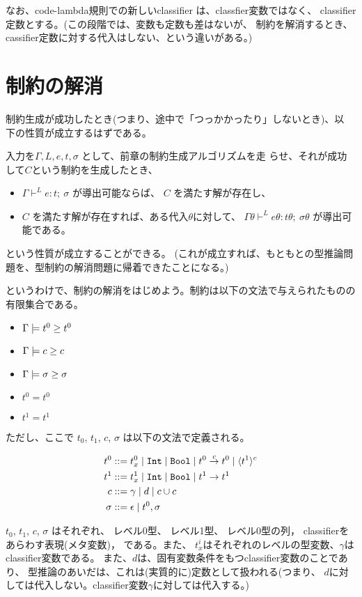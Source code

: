 なお、code-lambda規則での新しいclassifier は、classfier変数ではなく、
classifier定数とする。(この段階では、変数も定数も差はないが、
制約を解消するとき、cassifier定数に対する代入はしない、という違いがある。)

\section{制約の解消}

制約生成が成功したとき(つまり、途中で「つっかかったり」しないとき)、以
下の性質が成立するはずである。

入力を$\Gamma, L, e, t,\sigma$ として、前章の制約生成アルゴリズムを走
らせ、それが成功して$C$という制約を生成したとき、
\begin{itemize}
\item
  $\Gamma \vdash^L e: t; ~ \sigma$ が導出可能ならば、
  $C$ を満たす解が存在し、
\item
  $C$ を満たす解が存在すれば、ある代入$\theta$に対して、
  $\Gamma\theta \vdash^L e\theta: t\theta; ~ \sigma\theta$ が導出可能である。
\end{itemize}
という性質が成立することができる。
(これが成立すれば、もともとの型推論問題を、型制約の解消問題に帰着できたことになる。)

というわけで、制約の解消をはじめよう。制約は以下の文法で与えられたものの有限集合である。

\begin{itemize}
\item $\Gamma \models \longer{t^0}{t^0}$
\item $\Gamma \models \longer{c}{c}$
\item $\Gamma \models \longer{\sigma}{\sigma}$
\item $t^0=t^0$
\item $t^1=t^1$
\end{itemize}
ただし、ここで $t_0$, $t_1$, $c$, $\sigma$ は以下の文法で定義される。

\begin{align*}
  t^0      & ::= t^0_x \mid \Int \mid \Bool \mid \funT{t^0}{t^0}{c} \mid \codeT{t^1}{c} \\
  t^1      & ::= t^1_x \mid \Int \mid \Bool \mid \funT{t^1}{t^1}{} \\
  c        & ::= \gamma \mid d \mid c \uni c \\
  \sigma   & ::= \epsilon \mid t^0, \sigma
\end{align*}


$t_0$, $t_1$, $c$, $\sigma$ はそれぞれ、
レベル0型、
レベル1型、
レベル0型の列，
classifierをあらわす表現(メタ変数)，
である。また、
$t^i_x$はそれぞれのレベルの型変数、$\gamma$はclassifier変数である。
また、$d$は、固有変数条件をもつclassifier変数のことであり、
型推論のあいだは、これは(実質的に)定数として扱われる(つまり、
$d$に対しては代入しない。classifier変数$\gamma$に対しては代入する。)

